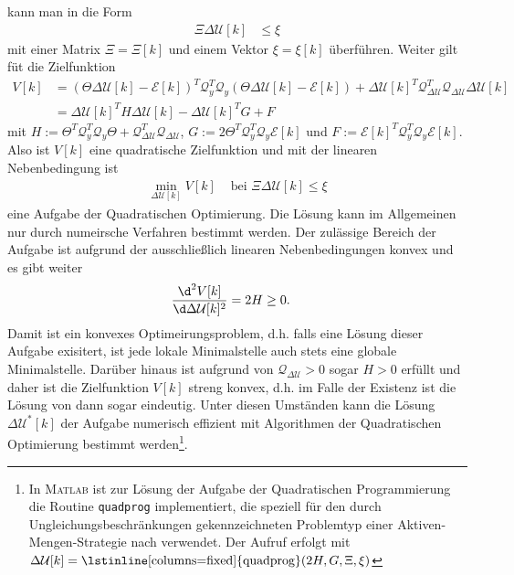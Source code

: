 kann man  in die Form
\begin{align}
	\Xi\Delta\mathcal{U}[k] & \le \xi\label{eqn:kap_4_lin_nebenbedinung_form}
\end{align}
mit einer Matrix $\Xi=\Xi[k]$ und einem Vektor $\xi = \xi[k]$ überführen. Weiter gilt füt die Zielfunktion
\begin{align*}
	V[k] & = \left( \Theta\Delta\mathcal{U}[k]-\mathcal{E}[k] \right)^T\mathcal{Q}_y^T\mathcal{Q}_y\left( \Theta\Delta\mathcal{U}[k]-\mathcal{E}[k]
	\right)+\Delta\mathcal{U}[k]^T\mathcal{Q}^T_{\Delta\mathcal{U}}\mathcal{Q}_{\Delta\mathcal{U}}\Delta\mathcal{U}[k]\\
	& = \Delta\mathcal{U}[k]^T H \Delta\mathcal{U}[k]-\Delta\mathcal{U}[k]^TG+F
\end{align*}
mit $H:=\Theta^T\mathcal{Q}_y^T\mathcal{Q}_y\Theta+\mathcal{Q}^T_{\Delta\mathcal{U}}\mathcal{Q}_{\Delta\mathcal{U}}$, $G:=2\Theta^T\mathcal{Q}_y^T\mathcal{Q}_y\mathcal{E}[k]$ und
$F:=\mathcal{E}[k]^T\mathcal{Q}_y^T\mathcal{Q}_y\mathcal{E}[k]$. Also ist $V[k]$ eine quadratische Zielfunktion und mit der linearen Nebenbedingung
 ist
\begin{align}
	\min\limits_{\Delta\mathcal{U}[k]}V[k] & \text{ bei } \Xi\Delta\mathcal{U}[k]\le \xi\label{eqn:kap_4_quad_opt_aufgabe_lin_nebenbedingungen}
\end{align}
eine Aufgabe der Quadratischen Optimierung. Die Lösung kann im Allgemeinen nur durch numeirsche Verfahren bestimmt werden. Der zulässige Bereich der Aufgabe ist aufgrund der
ausschließlich linearen Nebenbedingungen konvex und es gibt weiter
\begin{align*}
\frac{\d^2 V[k]}{\d\Delta\mathcal{U}[k]^2} & = 2 H \ge 0.
\end{align*}
Damit ist  ein konvexes Optimeirungsproblem, d.h. falls eine Lösung dieser Aufgabe exisitert, ist jede lokale Minimalstelle auch
stets eine globale Minimalstelle. Darüber hinaus ist aufgrund von $\mathcal{Q}_{\Delta\mathcal{U}}>0$ sogar $H>0$ erfüllt und daher ist die Zielfunktion $V[k]$ streng konvex, d.h. im
Falle der Existenz ist die Lösung von  dann sogar eindeutig. Unter diesen Umständen kann die Lösung $\Delta\mathcal{U}^{\ast}[k]$
der Aufgabe  numerisch effizient mit Algorithmen der Quadratischen Optimierung bestimmt werden\footnote{In \textsc{Matlab} ist zur Lösung
der Aufgabe der Quadratischen Programmierung die Routine \lstinline[columns=fixed]{quadprog} implementiert, die speziell für den durch Ungleichungsbeschränkungen gekennzeichneten
Problemtyp  einer Aktiven-Mengen-Strategie nach \cite{Gill1981} verwendet. Der Aufruf erfolgt mit
$\Delta\mathcal{U}[k]=\text{\lstinline[columns=fixed]{quadprog}}(2H,G,\Xi,\xi)$}.

